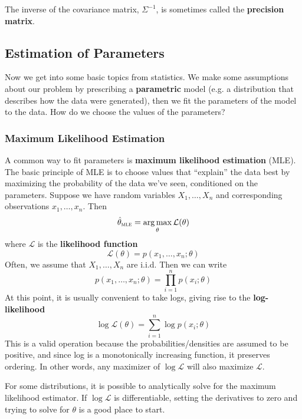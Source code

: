 \documentclass{article}
\DeclareMathOperator*{\argmax}{arg\,max}
\newcommand{\term}[1]{\textbf{#1}}
\begin{document}
The inverse of the covariance matrix, $\Sigma^{-1}$, is sometimes called the \term{precision matrix}.

\subsection{Estimation of Parameters}
Now we get into some basic topics from statistics. We make some assumptions about our problem by prescribing a \term{parametric} model (e.g. a distribution that describes how the data were generated), then we fit the parameters of the model to the data. How do we choose the values of the parameters?

\subsubsection{Maximum Likelihood Estimation}
A common way to fit parameters is \term{maximum likelihood estimation} (MLE). The basic principle of MLE is to choose values that ``explain'' the data best by maximizing the probability of the data we've seen, conditioned on the parameters. Suppose we have random variables $X_1, \dots, X_n$ and corresponding observations $x_1, \dots, x_n$. Then
\[\hat{\theta}_\textsc{mle} = \argmax_\theta \mathcal{L}(\theta)\]
where $\mathcal L$ is the \term{likelihood function}
\[\mathcal{L}(\theta) = p(x_1, \dots, x_n; \theta)\]
Often, we assume that $X_1, \dots, X_n$ are i.i.d. Then we can write
\[p(x_1, \dots, x_n; \theta) = \prod_{i=1}^n p(x_i; \theta)\]
At this point, it is usually convenient to take logs, giving rise to the \term{log-likelihood}
\[\log \mathcal{L}(\theta) = \sum_{i=1}^n \log p(x_i; \theta)\]
This is a valid operation because the probabilities/densities are assumed to be positive, and since log is a monotonically increasing function, it preserves ordering. In other words, any maximizer of $\log \mathcal L$ will also maximize $\mathcal L$.

For some distributions, it is possible to analytically solve for the maximum likelihood estimator. If $\log \mathcal L$ is differentiable, setting the derivatives to zero and trying to solve for $\theta$ is a good place to start.
\end{document}
